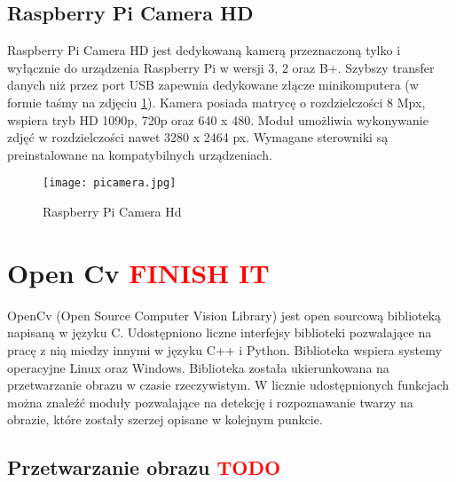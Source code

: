 \subsection{Raspberry Pi Camera HD}
Raspberry Pi Camera HD jest dedykowaną kamerą przeznaczoną tylko i wyłącznie do urządzenia Raspberry Pi w wersji 3, 2 oraz B+. Szybszy transfer danych niż przez port USB zapewnia dedykowane złącze minikomputera (w formie taśmy na zdjęciu \ref{fig:picamera}). Kamera posiada matrycę o rozdzielczości 8 Mpx, wspiera tryb HD 1090p, 720p oraz 640 x 480. Moduł umożliwia wykonywanie zdjęć w rozdzielczości nawet 3280 x 2464 px. Wymagane sterowniki są preinstalowane na kompatybilnych urządzeniach.
\begin{figure}[H]
	\centering
	\texttt{[image: picamera.jpg]}
	\caption{Raspberry Pi Camera Hd}
	\label{fig:picamera}
\end{figure}

\section{Open Cv  \textcolor{red}{FINISH IT}}
OpenCv (Open Source Computer Vision Library) jest open sourcową biblioteką napisaną w języku C. Udostępniono liczne interfejsy biblioteki pozwalające na pracę z nią miedzy innymi w języku C++ i Python. Biblioteka wspiera systemy operacyjne Linux oraz Windows. Biblioteka została ukierunkowana na przetwarzanie obrazu w czasie rzeczywistym. W licznie udostępnionych funkcjach można znaleźć moduły pozwalające na detekcję i rozpoznawanie twarzy na obrazie, które zostały szerzej opisane w kolejnym punkcie.

\subsection{Przetwarzanie obrazu \textcolor{red}{TODO}}

